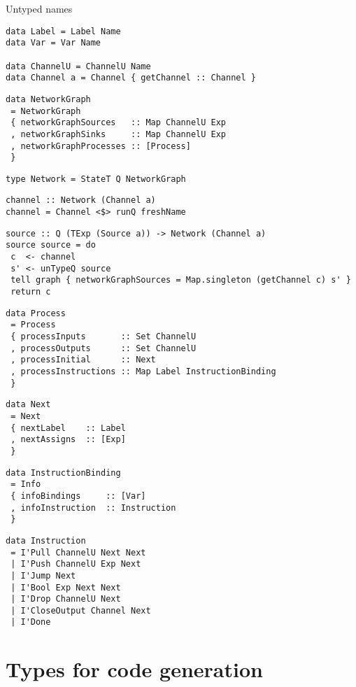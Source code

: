 Untyped names
\begin{lstlisting}
data Label = Label Name
data Var = Var Name

data ChannelU = ChannelU Name
data Channel a = Channel { getChannel :: Channel }
\end{lstlisting}


\begin{lstlisting}
data NetworkGraph
 = NetworkGraph
 { networkGraphSources   :: Map ChannelU Exp
 , networkGraphSinks     :: Map ChannelU Exp
 , networkGraphProcesses :: [Process]
 }
\end{lstlisting}

\begin{lstlisting}
type Network = StateT Q NetworkGraph
\end{lstlisting}

\begin{lstlisting}
channel :: Network (Channel a)
channel = Channel <$> runQ freshName
\end{lstlisting}

\begin{lstlisting}
source :: Q (TExp (Source a)) -> Network (Channel a)
source source = do
 c  <- channel
 s' <- unTypeQ source
 tell graph { networkGraphSources = Map.singleton (getChannel c) s' }
 return c
\end{lstlisting}


\begin{lstlisting}
data Process
 = Process
 { processInputs       :: Set ChannelU
 , processOutputs      :: Set ChannelU
 , processInitial      :: Next
 , processInstructions :: Map Label InstructionBinding
 }
\end{lstlisting}

\begin{lstlisting}
data Next
 = Next
 { nextLabel    :: Label
 , nextAssigns  :: [Exp]
 }
\end{lstlisting}

\begin{lstlisting}
data InstructionBinding
 = Info
 { infoBindings     :: [Var]
 , infoInstruction  :: Instruction
 }
\end{lstlisting}

\begin{lstlisting}
data Instruction
 = I'Pull ChannelU Next Next
 | I'Push ChannelU Exp Next
 | I'Jump Next
 | I'Bool Exp Next Next
 | I'Drop ChannelU Next
 | I'CloseOutput Channel Next
 | I'Done
\end{lstlisting}

\section{Types for code generation}

